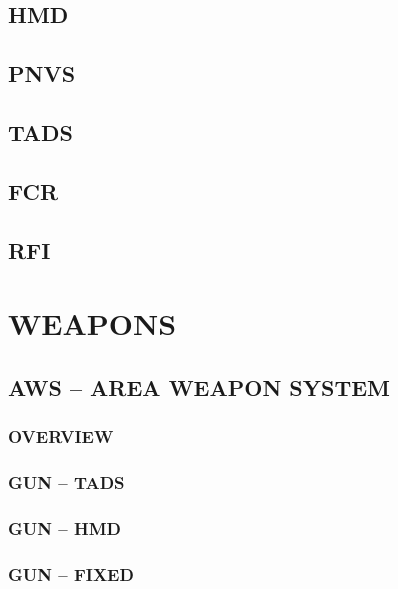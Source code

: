 \documentclass[fontHelvetica]{TechCheck}
\begin{document}
	\section{HMD}

	\clearpage 

	\section{PNVS}

	\clearpage

	\section{TADS}

	\clearpage

	\section{FCR}

	\clearpage 

	\section{RFI}

	\cleardoublepage

	\chapter{WEAPONS}
	\minitoc
	\cleardoublepage

	\section{AWS -- AREA WEAPON SYSTEM}
	\subsection{OVERVIEW}
	\subsection{GUN -- TADS}
	\subsection{GUN -- HMD} 
	\subsection{GUN -- FIXED}
\end{document}
